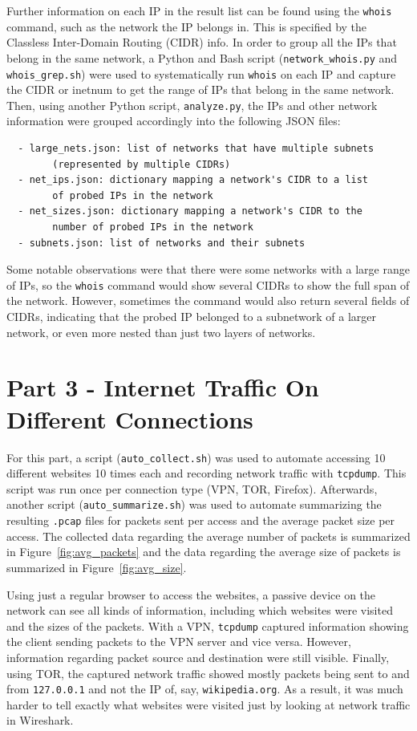 \documentclass[11pt]{article}
\begin{document}
Further information on each IP in the result list can be found using the \verb|whois| command, such
as the network the IP belongs in. This is specified by the Classless Inter-Domain Routing (CIDR)
info. In order to group all the IPs that belong in the same network, a Python and Bash script 
(\verb|network_whois.py| and \verb|whois_grep.sh|) were used to systematically run \verb|whois|
on each IP and capture the CIDR or inetnum to get the range of IPs that belong in the same network.
Then, using another Python script, \verb|analyze.py|, the IPs and other network information were
grouped accordingly into the following JSON files:
\begin{verbatim}
  - large_nets.json: list of networks that have multiple subnets
        (represented by multiple CIDRs)
  - net_ips.json: dictionary mapping a network's CIDR to a list
        of probed IPs in the network
  - net_sizes.json: dictionary mapping a network's CIDR to the
        number of probed IPs in the network
  - subnets.json: list of networks and their subnets
\end{verbatim}

Some notable observations were that there were some networks with a large range of IPs, so the 
\verb|whois| command would show several CIDRs to show the full span of the network. However,
sometimes the command would also return several fields of CIDRs, indicating that the probed IP
belonged to a subnetwork of a larger network, or even more nested than just two layers of
networks.
\section*{Part 3 - Internet Traffic On Different Connections}
For this part, a script (\verb|auto_collect.sh|) was used to automate accessing 10 different
websites 10 times each and recording network traffic with \verb|tcpdump|. This script was run
once per connection type (VPN, TOR, Firefox). Afterwards, another script (\verb|auto_summarize.sh|)
was used to automate summarizing the resulting \verb|.pcap| files for packets sent per access
and the average packet size per access. The collected data regarding the average number of packets
is summarized in Figure~\ref{fig:avg_packets} and the data regarding the average size of packets
is summarized in Figure~\ref{fig:avg_size}.

Using just a regular browser to access the websites, a passive device on the network can see
all kinds of information, including which websites were visited and the sizes of the packets. With a
VPN, \verb|tcpdump| captured information showing the client sending packets to the VPN server and
vice versa. However, information regarding packet source and destination were still visible. Finally,
using TOR, the captured network traffic showed mostly packets being sent to and from \verb|127.0.0.1|
and not the IP of, say, \verb|wikipedia.org|. As a result, it was much harder to tell exactly what
websites were visited just by looking at network traffic in Wireshark.
\end{document}
